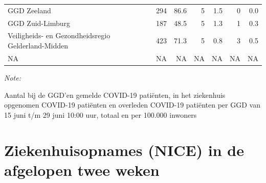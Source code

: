 \documentclass[
  english,
  man,floatsintext]{apa6}
\begin{document}
\begin{table}
\begin{threeparttable}
\begin{tabular}{lrrrrrr}
GGD Zeeland & 294 & 86.6 & 5 & 1.5 & 0 & 0.0\\
GGD Zuid-Limburg & 187 & 48.5 & 5 & 1.3 & 1 & 0.3\\
Veiligheids- en Gezondheidsregio Gelderland-Midden & 423 & 71.3 & 5 & 0.8 & 3 & 0.5\\
NA & NA & NA & NA & NA & NA & NA\\
\bottomrule
\end{tabular}
\begin{tablenotes}
\item \textit{Note: } 
\item Aantal bij de GGD’en gemelde COVID-19 patiënten, in het ziekenhuis opgenomen COVID-19 patiënten en overleden COVID-19 patiënten per GGD van 15 juni t/m 29 juni 10:00 uur, totaal en per 100.000 inwoners
\end{tablenotes}
\end{threeparttable}
\endgroup{}
\end{table}

\newpage

\hypertarget{ziekenhuisopnames-nice-in-de-afgelopen-twee-weken}{%
\section{Ziekenhuisopnames (NICE) in de afgelopen twee weken}\label{ziekenhuisopnames-nice-in-de-afgelopen-twee-weken}}
\end{document}
